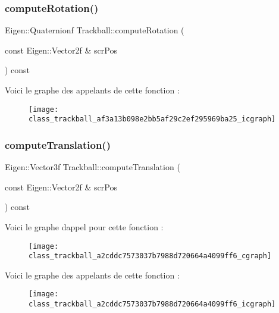 \subsubsection{\texorpdfstring{compute\+Rotation()}{computeRotation()}}
{\footnotesize\ttfamily Eigen\+::\+Quaternionf Trackball\+::compute\+Rotation (\begin{DoxyParamCaption}\item[{const Eigen\+::\+Vector2f \&}]{scr\+Pos }\end{DoxyParamCaption}) const\hspace{0.3cm}{\ttfamily [private]}}

Voici le graphe des appelants de cette fonction \+:
\nopagebreak
\begin{figure}[H]
\begin{center}
\leavevmode
\texttt{[image: class\_trackball\_af3a13b098e2bb5af29c2ef295969ba25\_icgraph]}
\end{center}
\end{figure}
\mbox{\label{class_trackball_a2cddc7573037b7988d720664a4099ff6}} 
\subsubsection{\texorpdfstring{compute\+Translation()}{computeTranslation()}}
{\footnotesize\ttfamily Eigen\+::\+Vector3f Trackball\+::compute\+Translation (\begin{DoxyParamCaption}\item[{const Eigen\+::\+Vector2f \&}]{scr\+Pos }\end{DoxyParamCaption}) const\hspace{0.3cm}{\ttfamily [private]}}

Voici le graphe d\textquotesingle{}appel pour cette fonction \+:
\nopagebreak
\begin{figure}[H]
\begin{center}
\leavevmode
\texttt{[image: class\_trackball\_a2cddc7573037b7988d720664a4099ff6\_cgraph]}
\end{center}
\end{figure}
Voici le graphe des appelants de cette fonction \+:
\nopagebreak
\begin{figure}[H]
\begin{center}
\leavevmode
\texttt{[image: class\_trackball\_a2cddc7573037b7988d720664a4099ff6\_icgraph]}
\end{center}
\end{figure}
\mbox{\label{class_trackball_acb8ad68c2077f4ff149e501acfe67d50}} 
